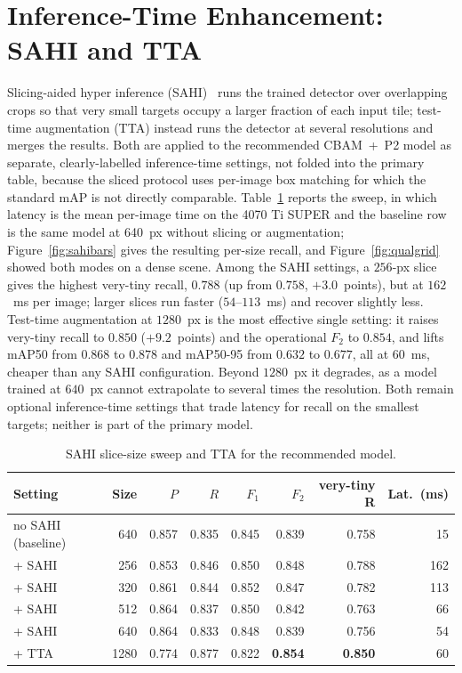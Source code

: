 \section{Inference-Time Enhancement: SAHI and TTA}
\label{sec:sahitta}
Slicing-aided hyper inference (SAHI)~\cite{akyon2022sahi} runs the trained detector
over overlapping crops so that very small targets occupy a larger fraction of each
input tile; test-time augmentation (TTA) instead runs the detector at several
resolutions and merges the results. Both are applied to the recommended CBAM~+~P2
model as separate, clearly-labelled inference-time settings, not folded into the
primary table, because the sliced protocol uses per-image box matching for which the
standard mAP is not directly comparable. Table~\ref{tab:sahi} reports the sweep, in which latency is the mean
per-image time on the 4070 Ti SUPER and the baseline row is the same model
at 640~px without slicing or augmentation; Figure~\ref{fig:sahibars} gives
the resulting per-size recall, and Figure~\ref{fig:qualgrid} showed both
modes on a dense scene. Among the SAHI
settings, a $256$-px slice gives the highest very-tiny recall, $0.788$ (up from
$0.758$, $+3.0$~points), but at $162$~ms per image; larger slices run faster
($54$--$113$~ms) and recover slightly less. Test-time augmentation at $1280$~px is
the most effective single setting: it raises very-tiny recall to $0.850$
($+9.2$~points) and the operational $F_2$ to $0.854$, and lifts mAP50 from $0.868$
to $0.878$ and mAP50-95 from $0.632$ to $0.677$, all at $60$~ms, cheaper than any
SAHI configuration. Beyond $1280$~px it degrades, as a model trained at $640$~px
cannot extrapolate to several times the resolution. Both remain optional
inference-time settings that trade latency for recall on the smallest targets;
neither is part of the primary model.

\begin{table}[H]
  \centering
  \caption{SAHI slice-size sweep and TTA for the recommended model.}
  \label{tab:sahi}
  \setlength{\tabcolsep}{4pt}
  \begin{tabular}{@{}l r r r r r r r@{}}
    \toprule
    Setting & Size & $P$ & $R$ & $F_1$ & $F_2$ & very-tiny R & Lat.\ (ms) \\
    \midrule
    no SAHI (baseline) & 640  & 0.857 & 0.835 & 0.845 & 0.839 & 0.758 & 15 \\
    + SAHI             & 256  & 0.853 & 0.846 & 0.850 & 0.848 & 0.788 & 162 \\
    + SAHI             & 320  & 0.861 & 0.844 & 0.852 & 0.847 & 0.782 & 113 \\
    + SAHI             & 512  & 0.864 & 0.837 & 0.850 & 0.842 & 0.763 & 66 \\
    + SAHI             & 640  & 0.864 & 0.833 & 0.848 & 0.839 & 0.756 & 54 \\
    + TTA              & 1280 & 0.774 & 0.877 & 0.822 & \textbf{0.854} & \textbf{0.850} & 60 \\
    \bottomrule
  \end{tabular}
\end{table}

